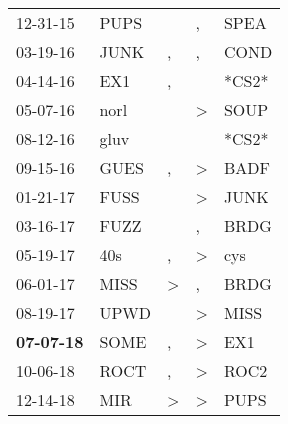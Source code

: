 \begin{supertabular}{p{0.07\textwidth}p{0.06\textwidth}p{0.02\textwidth}p{0.02\textwidth}p{0.06\textwidth}}
          12-31-15\textsuperscript{} &           PUPS\textsuperscript{} &                  &                , &           SPEA\textsuperscript{} \\
          03-19-16\textsuperscript{} &           JUNK\textsuperscript{} &                , &                , &           COND\textsuperscript{} \\
          04-14-16\textsuperscript{} &            EX1\textsuperscript{} &                , &                  &                            *CS2* \\
          05-07-16\textsuperscript{} &           norl\textsuperscript{} &                  &     \textgreater &           SOUP\textsuperscript{} \\
          08-12-16\textsuperscript{} &           gluv\textsuperscript{} &                  &                  &                            *CS2* \\
          09-15-16\textsuperscript{} &           GUES\textsuperscript{} &                , &     \textgreater &           BADF\textsuperscript{} \\
          01-21-17\textsuperscript{} &           FUSS\textsuperscript{} &                  &     \textgreater &           JUNK\textsuperscript{} \\
          03-16-17\textsuperscript{} &           FUZZ\textsuperscript{} &                  &                , &           BRDG\textsuperscript{} \\
          05-19-17\textsuperscript{} &            40s\textsuperscript{} &                , &     \textgreater &            cys\textsuperscript{} \\
          06-01-17\textsuperscript{} &           MISS\textsuperscript{} &     \textgreater &                , &           BRDG\textsuperscript{} \\
          08-19-17\textsuperscript{} &           UPWD\textsuperscript{} &                  &     \textgreater &           MISS\textsuperscript{} \\
 \textbf{07-07-18\textsuperscript{}} &           SOME\textsuperscript{} &                , &     \textgreater &            EX1\textsuperscript{} \\
          10-06-18\textsuperscript{} &           ROCT\textsuperscript{} &                , &     \textgreater &           ROC2\textsuperscript{} \\
          12-14-18\textsuperscript{} &            MIR\textsuperscript{} &     \textgreater &     \textgreater &           PUPS\textsuperscript{} \\

\end{supertabular}
